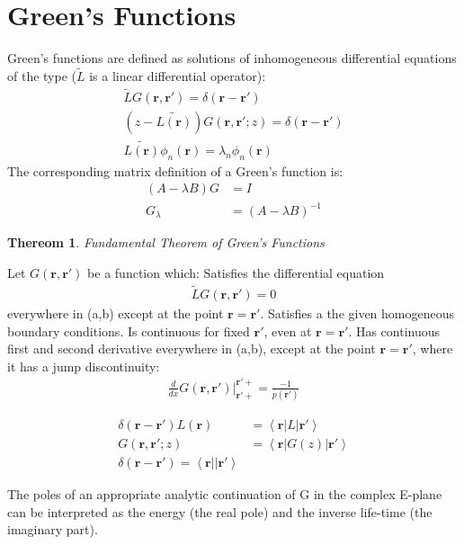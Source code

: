 \documentclass{article}
\newcommand{\ket}[1]{\left| #1 \right>} %
\newcommand{\bra}[1]{\left< #1 \right|} %
\newtheorem{mydef}{Thereom}
\numberwithin{equation}{section}
\begin{document}
\section*{Green's Functions}

Green's functions are defined as solutions of inhomogeneous differential equations of the type ($\tilde{L}$ is a linear differential operator):
\begin{align*}
	\tilde{L}G(\mathbf{r},\mathbf{r'})=\delta(\mathbf{r}-\mathbf{r'})\\
        (z-\tilde{L(\mathbf{r})})G(\mathbf{r},\mathbf{r'};z)=\delta(\mathbf{r}-\mathbf{r'})\\
\tilde{L(\mathbf{r})}\phi_n(\mathbf{r})=\lambda_n\phi_n(\mathbf{r})
\end{align*}
The corresponding matrix definition of a Green's function is:
\begin{align*}
	(A-\lambda B)G&=I\\
        G_{\lambda}&=(A-\lambda B)^{-1}
\end{align*}
\begin{mydef}Fundamental Theorem of Green's Functions
\end{mydef}
Let $G(\mathbf{r},\mathbf{r'})$ be a function which:
Satisfies the differential equation
\begin{align*}
	\tilde{L}G(\mathbf{r},\mathbf{r'})=0
\end{align*}
everywhere in (a,b) except at the point $\mathbf{r}=\mathbf{r'}$.
Satisfies a the given homogeneous boundary conditions.
Is continuous for fixed $\mathbf{r'}$, even at $\mathbf{r}=\mathbf{r'}$.
Has continuous first and second derivative everywhere in (a,b), except at the point $\mathbf{r}=\mathbf{r'}$, where it has a jump discontinuity:
\begin{align*}
	\frac{d}{dx}G(\mathbf{r},\mathbf{r'})|_{\mathbf{r'+}}^{\mathbf{r'+}}=\frac{-1}{p(\mathbf{r'})}
\end{align*}

\begin{align*}
	\delta(\mathbf{r}-\mathbf{r'})L(\mathbf{r})&=\bra{\mathbf{r}}L\ket{\mathbf{r'}}\\
	G(\mathbf{r},\mathbf{r'};z)&=\bra{\mathbf{r}}G(z)\ket{\mathbf{r'}}\\
        \delta(\mathbf{r}-\mathbf{r'})=\bra{\mathbf{r}}\ket{\mathbf{r'}}
\end{align*}

The poles of an appropriate analytic continuation of G in the complex E-plane can be interpreted as the energy (the real pole) and the inverse life-time (the imaginary part).
\end{document}
